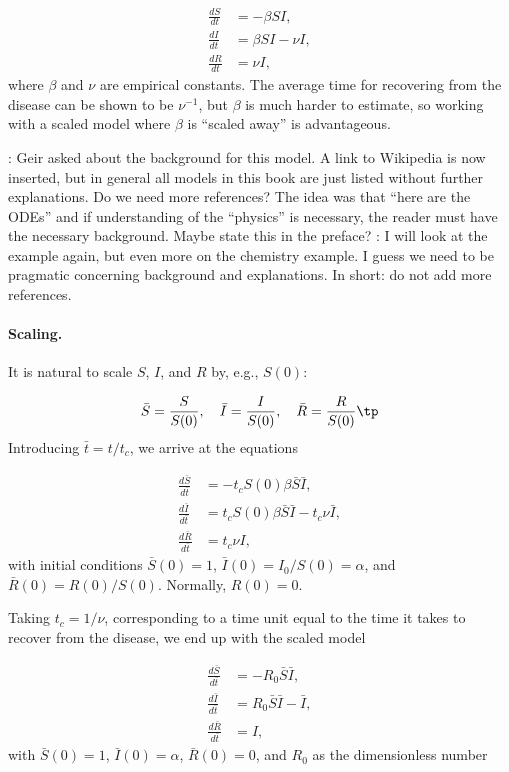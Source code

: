 \documentclass[graybox,envcountchap,sectrefs,final]{svmonodo}
\newcommand{\longinlinecomment}[3]{{\color{red}{\bf #1}: #2}}
\begin{document}
\begin{align}
\frac{dS}{dt} &= - \beta SI,
\label{scale:SIR:S}\\ 
\frac{dI}{dt} &= \beta SI - \nu I,
\label{scale:SIR:I}\\ 
\frac{dR}{dt} &= \nu I,
\label{scale:SIR:R}
\end{align}
where $\beta$ and $\nu$ are empirical constants. The average time for recovering
from the disease can be shown to be $\nu^{-1}$, but $\beta$ is much harder
to estimate, so working with a scaled model where $\beta$ is ``scaled away''
is advantageous.

\longinlinecomment{hpl 5}{ Geir asked about the background for this model. A link to Wikipedia is now inserted, but in general all models in this book are just listed without further explanations. Do we need more references? The idea was that ``here are the ODEs'' and if understanding of the ``physics'' is necessary, the reader must have the necessary background. Maybe state this in the preface? }{ Geir asked about the }
\longinlinecomment{Geir 6}{ I will look at the example again, but even more on the chemistry example. I guess we need to be pragmatic concerning background and explanations. In short: do not add more references. }{ I will look at }
\paragraph{Scaling.}
It is natural to scale $S$, $I$, and $R$ by, e.g., $S(0)$:

\[ \bar S = \frac{S}{S(0)},\quad \bar I = \frac{I}{S(0)},\quad
\bar R = \frac{R}{S(0)}\tp
\]
Introducing $\bar t = t/t_c$, we arrive at the equations

\begin{align*}
\frac{d\bar S}{d\bar t} &= - t_c S(0) \beta\bar S\bar I,
\\ 
\frac{d\bar I}{d\bar t} &= t_c S(0) \beta \bar S\bar I - t_c \nu \bar I,
\\ 
\frac{d\bar R}{d\bar t} &= t_c \nu I,
\end{align*}
with initial conditions $\bar S(0)=1$, $\bar I(0)=I_0/S(0)=\alpha$, and
$\bar R(0)=R(0)/S(0)$. Normally, $R(0)=0$.

Taking $t_c=1/\nu$, corresponding to a time unit equal to the time it takes
to recover from the disease, we end up with the scaled model

\begin{align}
\frac{d\bar S}{d\bar t} &= - R_0\bar S\bar I,
\label{scale:SIR:S2}\\ 
\frac{d\bar I}{d\bar t} &= R_0 \bar S\bar I - \bar I,
\label{scale:SIR:I2}\\ 
\frac{d\bar R}{d\bar t} &= I,
\label{scale:SIR:R2}
\end{align}
with $\bar S(0)=1$, $\bar I(0)=\alpha$, $\bar R(0)=0$, and $R_0$ as
the dimensionless number
\end{document}
